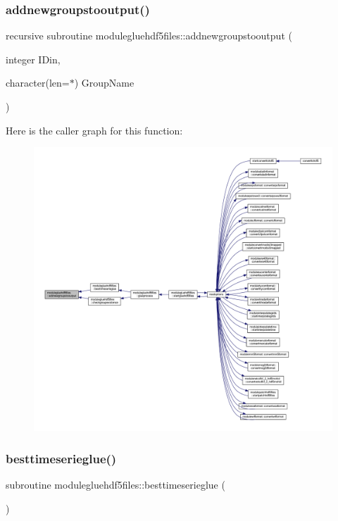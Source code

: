 \subsubsection{\texorpdfstring{addnewgroupstooutput()}{addnewgroupstooutput()}}
{\footnotesize\ttfamily recursive subroutine modulegluehdf5files\+::addnewgroupstooutput (\begin{DoxyParamCaption}\item[{integer}]{I\+Din,  }\item[{character(len=$\ast$)}]{Group\+Name }\end{DoxyParamCaption})\hspace{0.3cm}{\ttfamily [private]}}

Here is the caller graph for this function\+:\nopagebreak
\begin{figure}[H]
\begin{center}
\leavevmode
\includegraphics[width=350pt]{namespacemodulegluehdf5files_adf08cc960a9d299d5f221e46c1ec20bd_icgraph}
\end{center}
\end{figure}
\mbox{\label{namespacemodulegluehdf5files_a88e3c5be0d990bbff5725309d8c04656}} 
\subsubsection{\texorpdfstring{besttimeserieglue()}{besttimeserieglue()}}
{\footnotesize\ttfamily subroutine modulegluehdf5files\+::besttimeserieglue (\begin{DoxyParamCaption}{ }\end{DoxyParamCaption})\hspace{0.3cm}{\ttfamily [private]}}


